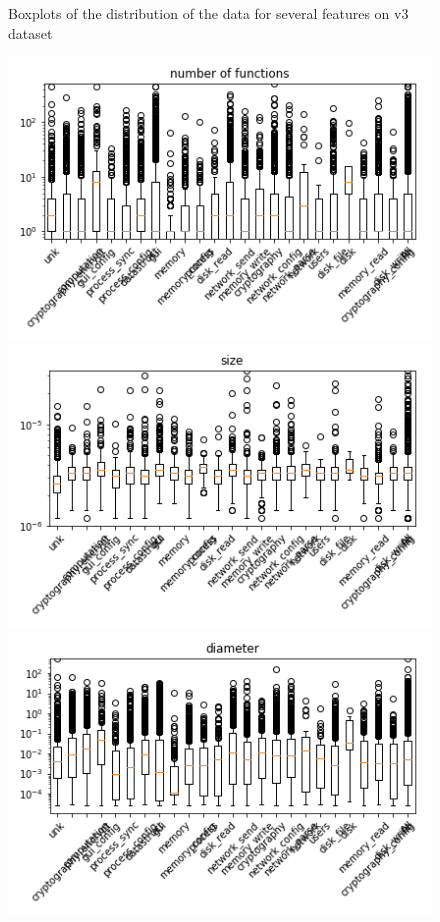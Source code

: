 \begin{appendices}
\begin{figure}[H]
\caption{Boxplots of the distribution of the data for several features on v3 dataset}\label{fig:distribution_analysis5}
\end{figure}




\begin{figure}[H]

%
\centering
\includegraphics[width=0.9\linewidth]{img/boxplots/v3_unbalanced_number_of_functions.png}
\endminipage
{}%
\centering
\includegraphics[width=0.9\linewidth]{img/boxplots/v3_unbalanced_size.png}
\endminipage
{}%
\centering
\includegraphics[width=0.9\linewidth]{img/boxplots/v3_unbalanced_diameter.png}
\endminipage


\end{figure}
\end{appendices}
